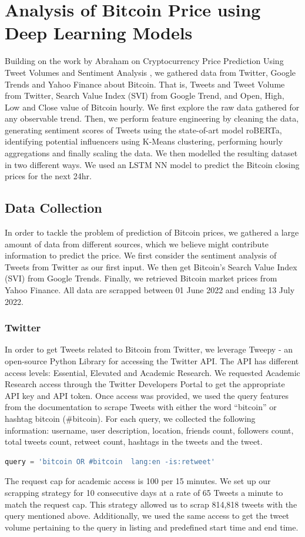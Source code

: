 \chapter{Analysis of Bitcoin Price using Deep Learning Models}
Building on the work by Abraham on Cryptocurrency Price Prediction Using Tweet Volumes and Sentiment Analysis \cite{Abraham2018}, we gathered data from Twitter, Google Trends and Yahoo Finance about Bitcoin. That is, Tweets and Tweet Volume from Twitter, Search Value Index (SVI) from Google Trend, and Open, High, Low and Close value of Bitcoin hourly. We first explore the raw data gathered for any observable trend. Then, we perform feature engineering by cleaning the data, generating sentiment scores of Tweets using the state-of-art model roBERTa, identifying potential influencers using K-Means clustering, performing hourly aggregations and finally scaling the data. We then modelled the resulting dataset in two different ways. We used an LSTM NN model to predict the Bitcoin closing prices for the next 24hr.

\section{Data Collection}
In order to tackle the problem of prediction of Bitcoin prices, we gathered a large amount of data from different sources, which we believe might contribute information to predict the price. We first consider the sentiment analysis of Tweets from Twitter as our first input. We then get Bitcoin's Search Value Index (SVI) from Google Trends. Finally, we retrieved Bitcoin market prices from Yahoo Finance. All data are scrapped between 01 June 2022 and ending 13 July 2022.
\subsection*{Twitter}
In order to get Tweets related to Bitcoin from Twitter, we leverage Tweepy - an open-source Python Library for accessing the Twitter API. The API has different access levels: Essential, Elevated and Academic Research. We requested Academic Research access through the Twitter Developers Portal to get the appropriate API key and API token. Once access was provided, we used the query features from the documentation to scrape Tweets with either the word “bitcoin” or hashtag bitcoin (\#bitcoin). For each query, we collected the following information: username, user description, location, friends count, followers count, total tweets count, retweet count, hashtags in the tweets and the tweet.
\begin{lstlisting}[language=Python, caption= {Tweepy query for bitcoin, \#bitcoin and excluding re\-tweets}, label = tweet_search]
    query = 'bitcoin OR #bitcoin  lang:en -is:retweet'
\end{lstlisting}
The request cap for academic access is 100 per 15 minutes. We set up our scrapping strategy for 10 consecutive days at a rate of 65 Tweets a minute to match the request cap. This strategy allowed us to scrap 814,818 tweets with the query mentioned above. Additionally, we used the same access to get the tweet volume pertaining to the query in listing  and predefined start time and end time.

